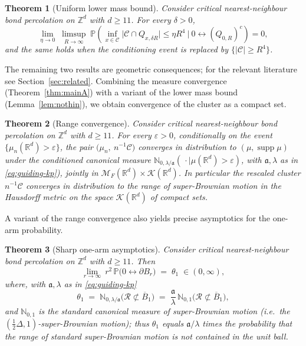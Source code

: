 \documentclass[11pt]{article}
\newtheorem{theorem}{Theorem}[section]
\theoremstyle{definition}
\theoremstyle{remark}
\newcommand{\R}{\mathbb{R}}
\newcommand{\Z}{\mathbb{Z}}
\newcommand{\bP}{\mathbb{P}}
\newcommand{\cM}{{\mathcal{M}_F(\R^d)}}          %
\newcommand{\supp}{\operatorname{supp}}
\newcommand{\Ran}{\mathcal{R}}                 %
\newcommand{\eps}{\varepsilon}
\numberwithin{equation}{section}
\theoremstyle{plain}
\theoremstyle{definition}
\theoremstyle{remark}
\theoremstyle{plain}
\begin{document}
\begin{theorem}[Uniform lower mass bound]\label{thm:mainLMB}
Consider critical nearest-neighbour bond percolation on $\Z^d$ with $d\geq 11$. For every $\delta>0$,
\[
\lim_{\eta\rightarrow 0}\;\limsup_{R\rightarrow\infty}\;
\bP\left(\inf_{x\in \mathcal C}\bigl|\mathcal C\cap Q_{x,\delta R}\bigr|
\leq \eta R^4 \:\Big\vert\:0\leftrightarrow (Q_{0,R})^c\right)=0,
\]
and the same holds when the conditioning event is replaced by
$\{|\mathcal C|\geq R^4\}$.
\end{theorem}

The remaining two results are geometric consequences; for the relevant
literature see Section~\ref{sec:related}. Combining the measure
convergence (Theorem~\ref{thm:mainA}) with a variant of the
lower mass bound (Lemma~\ref{lem:nothin}), we obtain convergence of the cluster as a compact
set.

\begin{theorem}[Range convergence]\label{thm:mainD}
Consider critical nearest-neighbour bond percolation on $\Z^d$ with $d\geq 11$. For every $\eps>0$, conditionally on the event $\{\mu_n(\R^d)>\eps\}$, the pair
$\bigl(\mu_n,\ n^{-1}\mathcal C\bigr)$ converges in distribution to $(\mu,\supp\mu)$ under the
conditioned canonical measure $\mathbb{N}_{0,\lambda/\mathfrak a}(\,\cdot\mid\mu(\R^d)>\eps)$, with $\mathfrak a,\lambda$ as in \eqref{eq:guiding-kp}), jointly in $\cM\times\mathcal K(\R^d)$. In particular the rescaled cluster $n^{-1}\mathcal C$
converges in distribution to the range of super-Brownian motion in the Hausdorff metric on the
space $\mathcal K(\R^d)$ of compact sets.
\end{theorem}

A variant of the range convergence also yields precise asymptotics for the one-arm probability.

\begin{theorem}[Sharp one-arm asymptotics]\label{thm:mainC}
Consider critical nearest-neighbour bond percolation on $\Z^d$ with $d\geq 11$. Then
\[
\lim_{r\to\infty}\ r^2\,\bP\bigl(0\leftrightarrow\partial B_r\bigr)
\;=\;\theta_1\;\in(0,\infty),
\]
where, with $\mathfrak a,\lambda$ as in \eqref{eq:guiding-kp}
\[
\theta_1\;=\;\mathbb{N}_{0,\lambda/\mathfrak a}\bigl(\Ran\not\subset\overline B_1\bigr)\;=\;\frac{\mathfrak a}{\lambda}\,\mathbb{N}_{0,1}\bigl(\Ran\not\subset\overline B_1\bigr),
\]
and $\mathbb{N}_{0,1}$ is the standard canonical measure of super-Brownian motion (i.e.\ the $(\tfrac12\Delta,1)$-super-Brownian motion); thus $\theta_1$ equals $\mathfrak a/\lambda$ times the probability that the range of standard super-Brownian motion is not contained in the unit ball.
\end{theorem}
\end{document}
